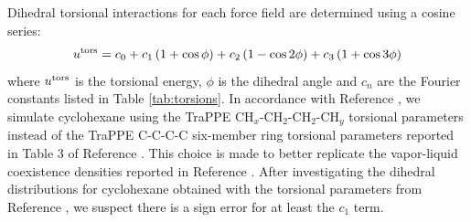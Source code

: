 \documentclass[journal=jced,manuscript=article]{achemso}
\begin{document}
    Dihedral torsional interactions for each force field are determined using a cosine series:
    \begin{equation}
    u^{\rm tors} = c_0 + c_1 \left(1+\cos{\phi}\right) + c_2 \left(1-\cos{2\phi}\right) + c_3 \left(1+\cos{3\phi}\right)
    \end{equation}
    where $u^{\rm tors}$ is the torsional energy, $\phi$ is the dihedral angle and $c_n$ are the Fourier constants listed in Table \ref{tab:torsions}. In accordance with Reference , we simulate cyclohexane using the TraPPE CH$_x$-CH$_2$-CH$_2$-CH$_y$ torsional parameters instead of the TraPPE C-C-C-C six-member ring torsional parameters reported in Table 3 of Reference . This choice is made to better replicate the vapor-liquid coexistence densities reported in Reference . After investigating the dihedral distributions for cyclohexane obtained with the torsional parameters from Reference \cite{Keasler2012}, we suspect there is a sign error for at least the $c_1$ term.
    
    
    
 
\end{document}
